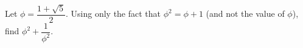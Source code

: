 Let $\phi=\dfrac{1+\sqrt5}{2}$. Using only the fact that $\phi^2=\phi+1$ (and not the value of $\phi$), find $\phi^2+\dfrac1{\phi^2}$.
